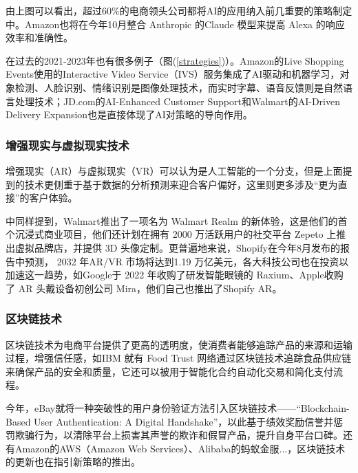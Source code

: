 \documentclass[12pt]{ctexart}
\begin{document}
由上图可以看出，超过60\%的电商领头公司都将AI的应用纳入前几重要的策略制定中。Amazon也将在今年10月整合 Anthropic 的Claude 模型来提高 Alexa 的响应效率和准确性\cite{44}。

在过去的2021-2023年也有很多例子（图(\ref{strategies})）。Amazon的Live Shopping Events使用的Interactive Video Service（IVS）服务集成了AI驱动和机器学习，对象检测、人脸识别、情绪识别是图像处理技术，而实时字幕、语音反馈则是自然语言处理技术；JD.com的AI-Enhanced Customer Support和Walmart的AI-Driven Delivery Expansion也是直接体现了AI对策略的导向作用。

\subsubsection{增强现实与虚拟现实技术}
增强现实（AR）与虚拟现实（VR）可以认为是人工智能的一个分支，但是上面提到的技术更侧重于基于数据的分析预测来迎合客户偏好，这里则更多涉及“更为直接”的客户体验。

\cite{40}中同样提到，Walmart推出了一项名为 Walmart Realm 的新体验，这是他们的首个沉浸式商业项目，他们还计划在拥有 2000 万活跃用户的社交平台 Zepeto 上推出虚拟品牌店，并提供 3D 头像定制。更普遍地来说，Shopify在今年8月发布的报告\cite{43}中预测， 2032 年AR/VR 市场将达到1.19 万亿美元，各大科技公司也在投资以加速这一趋势，如Google于 2022 年收购了研发智能眼镜的 Raxium、Apple收购了 AR 头戴设备初创公司 Mira，他们自己也推出了Shopify AR。



\subsubsection{区块链技术}
区块链技术为电商平台提供了更高的透明度，使消费者能够追踪产品的来源和运输过程，增强信任感，如IBM 就有 Food Trust 网络通过区块链技术追踪食品供应链来确保产品的安全和质量，它还可以被用于智能化合约自动化交易和简化支付流程。

今年，eBay就将一种突破性的用户身份验证方法引入区块链技术——“Blockchain-Based User Authentication: A Digital Handshake”，以此基于绩效奖励信誉并惩罚欺骗行为，以清除平台上损害其声誉的欺诈和假冒产品，提升自身平台口碑\cite{45}。还有Amazon的AWS（Amazon Web Services）、Alibaba的蚂蚁金服...，区块链技术的更新也在指引新策略的推出。
\end{document}
